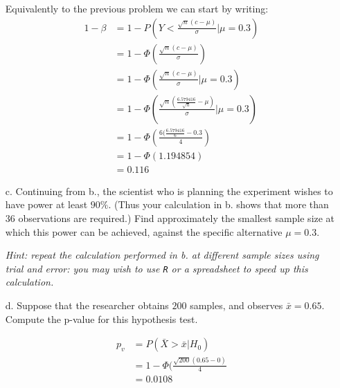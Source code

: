 \documentclass{article}
\newcommand{\1}{\mathbf{1}}
\begin{document}
\begin{itemize}
    Equivalently to the previous problem we can start by writing:
    \begin{align*}
        1 - \beta &=  1- P \left(Y < \frac{\sqrt{n}(c - \mu)}{\sigma}  \bigg | \mu=0.3 \right) \\
        &=  1 - \Phi  \left(\frac{\sqrt{n}(c - \mu)}{\sigma}\right) \\
        &= 1- \Phi\left( \frac{\sqrt{n}(c - \mu)}{\sigma}  \bigg | \mu=0.3 \right) \\
        &= 1- \Phi\left( \frac{\sqrt{n}(\frac{6.579416}{\sqrt{n}} - \mu)}{\sigma}  \bigg | \mu=0.3 \right) \\
        &= 1- \Phi\left( \frac{6(\frac{6.579416}{6} - 0.3}{4} \right) \\
        &= 1- \Phi(1.194854 ) \\
        &= 0.116
    \end{align*}

    \item[c.] Continuing from b., the scientist who is planning the experiment wishes to have power at least $90\%$. (Thus your calculation in b. shows that more than $36$ observations are required.) Find approximately the smallest sample size at which this power can be achieved, against the specific alternative $\mu=0.3$.\par 
    {\it Hint: repeat the calculation performed in {\rm b.} at different sample sizes using trial and error: you may wish to use {\tt R} or a spreadsheet to speed up this calculation.}

   \item[d.] Suppose that the researcher obtains $200$ samples, and observes $\bar{x} = 0.65$. Compute the p-value for this hypothesis test.
   
   \begin{align*}
       p_v &= P(\bar X > \bar x | H_0) \\
       &= 1 - \Phi(\frac{\sqrt{200}(0.65 - 0)}{4} \\
       &= 0.0108
   \end{align*}
\end{itemize}


\newpage
\end{document}
